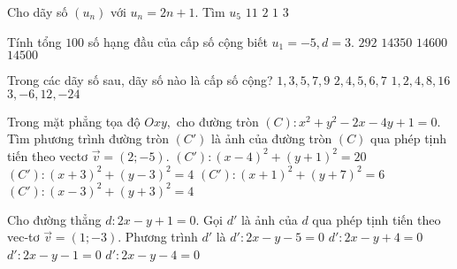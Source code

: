 \begin{ex}%
	Cho dãy số $(u_n)$ với $u_n=2n+1$. Tìm $u_5$ 
	\choice
	{ \True $11$}
	{ $2$}
	{ $1$} 
	{ $3$}
\end{ex}

\begin{ex}%
	Tính tổng $100$ số hạng đầu của cấp số cộng biết $u_1=-5,d=3.$ 
	\choice
	{$ 292 $}
	{\True $ 14350 $}
	{$ 14600 $}
			{$ 14500 $}
\end{ex}

\begin{ex}%
	Trong các dãy số sau, dãy số nào là cấp số cộng?
	\choice
	{\True $1, 3, 5, 7, 9$}
	{$2, 4, 5, 6, 7$}
	{$1, 2, 4, 8, 16$}
	{$3, -6, 12, -24$}
\end{ex}

\begin{ex}%
	Trong mặt phẳng tọa độ $Oxy,$ cho đường tròn $(C):{x}^2+y^2-2x-4y+1=0.$ Tìm phương trình đường tròn $({C}')$ là ảnh của đường tròn $(C)$ qua phép tịnh tiến theo vectơ $\vec{v}=(2;-5).$
\choice
{$({C}'):{\left(x-4\right)}^2+{\left(y+1\right)}^2=20$}
{$({C}'):{\left(x+3\right)}^2+{\left(y-3\right)}^2=4$}
{$({C}'):{\left(x+1\right)}^2+{\left(y+7\right)}^2=6$}
{\True $({C}'):{\left(x-3\right)}^2+{\left(y+3\right)}^2=4$}
\end{ex}

\begin{ex}%
		Cho đường thẳng $d:2x-y+1=0$. Gọi ${d}'$ là ảnh của $d$ qua phép tịnh tiến theo vec-tơ $\overrightarrow{v}=\left(1;-3\right)$. Phương trình ${d}'$ là
		\choice
		{${d}':2x-y-5=0$}
		{${d}':2x-y+4=0$}
		{${d}':2x-y-1=0$}
		{\True ${d}':2x-y-4=0$}
	\end{ex}

